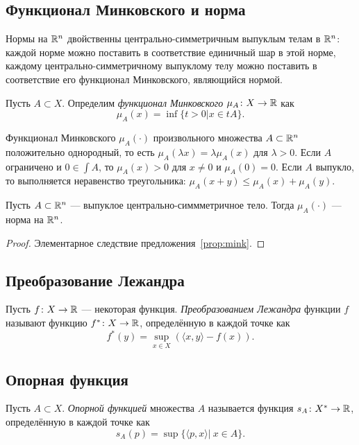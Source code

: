 \subsection{Функционал Минковского и норма}
Нормы на $\mathbb {R}^n$ двойственны центрально-симметричным выпуклым телам в $\mathbb {R}^n$: каждой норме можно поставить в соответствие единичный шар в этой норме, каждому центрально-симметричному выпуклому телу можно поставить в соответствие его функционал Минковского, являющийся нормой.
\begin{defin}
	Пусть $A\subset X$. Определим \textit{функционал Минковского} $\mu_A\colon X\to\mathbb {R}$ как
		\begin{equation}
			\mu_A(x)=\inf\{t>0|x\in tA\}.
		\end{equation}
\end{defin}
\begin{prop}\label{prop:mink}
	Функционал Минковского $\mu_A(\cdot)$ произвольного множества $A\subset\mathbb {R}^n$ положительно однородный, то есть $\mu_A(\lambda x)=\lambda\mu_A(x)$ для $\lambda>0$. Если $A$ ограничено и $0\in\int A$, то $\mu_A(x)>0$ для $x\neq 0$ и $\mu_A(0)=0$. Если $A$ выпукло, то выполняется неравенство треугольника: $\mu_A(x+y)\leqslant\mu_A(x)+\mu_A(y)$.
\end{prop}
\begin{prop}
	Пусть $A\subset\mathbb {R}^n$ --- выпуклое центрально-симмметричное тело. Тогда $\mu_A(\cdot)$ --- норма на $\mathbb {R}^n$.
\end{prop}
\begin{proof}
	Элементарное следствие предложения~\ref{prop:mink}.
\end{proof}

\subsection{Преобразование Лежандра}
\begin{defin}
	Пусть $f\colon X\to\mathbb {R}$ --- некоторая функция. \textit{Преобразованием Лежандра} функции $f$ называют функцию $f^*\colon X\to\mathbb {R}$, определённую в каждой точке как
		\begin{equation}
			f^*(y)=\sup_{x\in X}(\langle x,y\rangle-f(x)).
		\end{equation}
\end{defin}

\subsection{Опорная функция}
\begin{defin}
	Пусть $A\subset X$. \textit{Опорной функцией} множества $A$ называется функция $s_A\colon X^*\to\mathbb {R}$, определённую в каждой точке как
		\begin{equation}
			s_A(p)=\sup\{\langle p,x\rangle|\ x\in A\}.
		\end{equation}
\end{defin}

